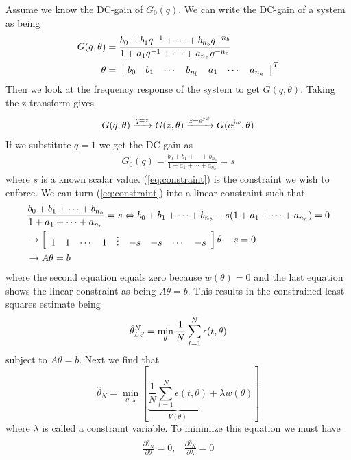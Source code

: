 \documentclass[lecture,12pt,]{pcms-l}
\begin{document}
\begin{example}
Assume we know the DC-gain of $G_0(q)$. We can write the DC-gain of a system as being
\begin{align*}
G(q,\theta) &= \frac{b_0+b_1q^{-1}+\cdots+b_{n_b}q^{-n_b}}{1+a_1q^{-1}+\cdots+a_{n_a}q^{-n_a}} \\
\theta &= \left[\begin{array}{c c c c c c c} b_0 & b_1 & \cdots & b_{n_b} & a_1 & \cdots & a_{n_a} \end{array}\right]^T \\
\end{align*}
Then we look at the frequency response of the system to get $G(q,\theta)$. Taking the z-transform gives
$$G(q,\theta) \xrightarrow{q=z} G(z,\theta) \xrightarrow{z=e^{j\omega}} G(e^{j\omega},\theta)$$
If we substitute $q=1$ we get the DC-gain as
\begin{align}
\label{eq:constraint}
G_0(q) = \frac{b_0+b_1+\cdots+b_{n_b}}{1+a_1+\cdots+a_{n_a}} = s
\end{align}
where $s$ is a known scalar value. (\ref{eq:constraint}) is the constraint we wish to enforce. We can turn (\ref{eq:constraint}) into a linear constraint such that
\begin{align*}
&\frac{b_0+b_1+\cdots+b_{n_b}}{1+a_1+\cdots+a_{n_a}} = s \Leftrightarrow b_0+b_1+\cdots+b_{n_b} - s(1+a_1+\cdots+a_{n_a}) = 0 \\
&\rightarrow \left[\begin{array}{c c c c c c c c c} 1 & 1 & \cdots & 1 & \vdots & -s & -s & \cdots & -s \end{array}\right]\theta-s=0 \\
&\rightarrow A\theta = b
\end{align*}
where the second equation equals zero because $w(\theta)=0$ and the last equation shows the linear constraint as being $A\theta=b$. This results in the constrained least squares estimate being
$$\hat{\theta}_{LS}^N = \min_\theta\frac{1}{N}\sum_{t=1}^N\epsilon(t,\theta)$$
subject to $A\theta=b$. Next we find that
$$\hat{\theta}_N = \min_{\theta,\lambda}[\underbrace{\frac{1}{N}\sum_{t=1}^N\epsilon(t,\theta)}_{V(\theta)} +\lambda w(\theta)]$$
where $\lambda$ is called a constraint variable. To minimize this equation we must have
\begin{align*}
\begin{split}
\frac{\partial\hat{\theta}_N}{\partial\theta}=0,
\end{split}
\begin{split}
\frac{\partial\hat{\theta}_N}{\partial\lambda}=0

\end{split}
\end{align*}
\end{example}
\end{document}
